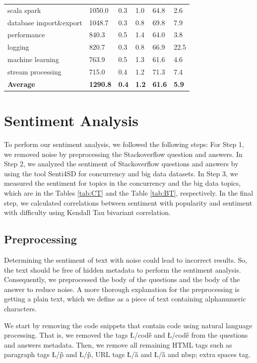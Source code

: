 \begin{table}[tbp]
\begin{tabular}{p{1.4in}p{.5in}p{.6in}p{.4in}p{.9in}p{.9in}}
scala spark & 1050.0 & 0.3 & 1.0 & 64.8 & 2.6\\
database import\&export & 1048.7 & 0.3 & 0.8 & 69.8 & 7.9 \\
performance & 840.3 & 0.5 & 1.4 & 64.0 & 3.8\\
logging & 820.7 & 0.3 & 0.8 & 66.9 & 22.5 \\
machine learning & 763.9 & 0.5 & 1.3 & 61.6 & 4.6\\
stream processing & 715.0 & 0.4 & 1.2 & 71.3 & 7.4\\ \hline
\textbf{Average} & \textbf{1290.8} & \textbf{0.4} & \textbf{1.2} & \textbf{61.6} & \textbf{5.9} \\ \hline
\end{tabular}
\end{table}

\section{Sentiment Analysis}

To perform our sentiment analysis, we followed the following steps: For Step 1, we removed noise by preprocessing the Stackoverflow question and answers. In Step 2, we analyzed the sentiment of Stackoverflow questions and answers by using the tool Senti4SD for concurrency and big data datasets. In Step 3, we measured the sentiment for topics in the concurrency and the big data topics, which are in the Tables \ref{tab:CT} and the Table \ref{tab:BT}, respectively. In the final step, we calculated correlations between sentiment with popularity and sentiment with difficulty using Kendall Tau bivariant correlation. 

\subsection{Preprocessing}
Determining the sentiment of text with noise could lead to incorrect results. So, the text should be free of hidden metadata to perform the sentiment analysis. Consequently, we preprocessed the body of the questions and the body of the answer to reduce noise. A more thorough explanation for the preprocessing is getting a plain text, which we define as a piece of text containing alphanumeric characters.

We start by removing the code snippets that contain code using natural language processing. That is, we removed the tags {\L/code\G} and {\L/code\G} from the questions and answers metadata. Then, we remove all remaining HTML tags such as paragraph tags {\L/p\G} and {\L/p\G}, URL tags {\L/a\G} and {\L/a\G} and nbsp; extra spaces tag. 

